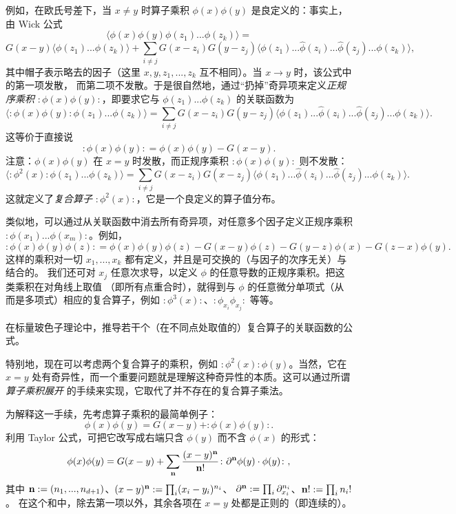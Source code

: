 例如，在欧氏号差下，当 $x\ne y$ 时算子乘积 $\phi(x)\phi(y)$ 是良定义的：事实上，由 Wick 公式
$$
\langle \phi(x)\phi(y)\phi(z_1)...\phi(z_k)\rangle=
$$
$$
G(x-y)\langle \phi(z_1)...\phi(z_k)\rangle
+\sum_{i\ne j}G(x-z_i)G(y-z_j)\langle \phi(z_1)...\widehat \phi(z_i)...\widehat \phi(z_j)...\phi(z_k)\rangle,
$$
其中帽子表示略去的因子（这里 $x,y,z_1,...,z_k$ 互不相同）。当 $x\to y$ 时，该公式中的第一项发散，
而第二项不发散。于是很自然地，通过“扔掉”奇异项来定义\emph{正规序乘积}
$\colon \phi(x)\phi(y)\colon$，即要求它与 $\phi(z_1)...\phi(z_k)$ 的关联函数为
 $$
\langle \colon\phi(x)\phi(y)\colon\phi(z_1)...\phi(z_k)\rangle=
\sum_{i\ne j}G(x-z_i)G(y-z_j)\langle \phi(z_1)...\widehat \phi(z_i)...\widehat \phi(z_j)...\phi(z_k)\rangle.
$$
这等价于直接说
$$
\colon\phi(x)\phi(y)\colon=\phi(x)\phi(y)-G(x-y).
$$
注意：$\phi(x)\phi(y)$ 在 $x=y$ 时发散，而正规序乘积 $\colon \phi(x)\phi(y)\colon$ 则不发散：
$$
\langle \colon\phi^2(x)\colon\phi(z_1)...\phi(z_k)\rangle=
\sum_{i\ne j}G(x-z_i)G(x-z_j)\langle \phi(z_1)...\widehat \phi(z_i)...\widehat \phi(z_j)...\phi(z_k)\rangle.
$$
这就定义了\emph{复合算子} $\colon\phi^2(x)\colon$，它是一个良定义的算子值分布。

类似地，可以通过从关联函数中消去所有奇异项，对任意多个因子定义正规序乘积
$\colon \phi(x_1)...\phi(x_m)\colon$。例如，
$$
\colon \phi(x)\phi(y)\phi(z)\colon=\phi(x)\phi(y)\phi(z)-G(x-y)\phi(z)-G(y-z)\phi(x)-G(z-x)\phi(y).
$$
这样的乘积对一切 $x_1,...,x_k$ 都有定义，并且是可交换的（与因子的次序无关）与结合的。
我们还可对 $x_j$ 任意次求导，以定义 $\phi$ 的任意导数的正规序乘积。把这类乘积在对角线上取值
（即所有点重合时），就得到与 $\phi$ 的任意微分单项式（从而是多项式）相应的复合算子，例如
$\colon\phi^3(x)\colon$、$:\phi_{x_i}\phi_{x_j}:$ 等等。

\begin{exercise} 在标量玻色子理论中，推导若干个（在不同点处取值的）复合算子的关联函数的公式。
\end{exercise} 

特别地，现在可以考虑两个复合算子的乘积，例如 $\colon\phi^2(x)\colon \phi(y)$。当然，它在
$x=y$ 处有奇异性，而一个重要问题就是理解这种奇异性的本质。这可以通过所谓\emph{算子乘积展开}
的手续来实现，它取代了并不存在的复合算子乘法。

为解释这一手续，先考虑算子乘积的最简单例子：
$$
\phi(x)\phi(y)=G(x-y)+\colon \phi(x)\phi(y)\colon.
$$
利用 Taylor 公式，可把它改写成右端只含 $\phi(y)$ 而不含 $\phi(x)$ 的形式：
$$
\phi(x)\phi(y)=G(x-y)+\sum_{\bold n}\frac{(x-y)^{\bold n}}{\bold n!}\colon \partial^{\bold n}\phi(y)\cdot \phi(y)\colon,
$$
其中 $\bold n:=(n_1,...,n_{d+1})$、$(x-y)^\bold n:=\prod_i (x_i-y_i)^{n_i}$、
$\partial^{\bold n}:=\prod_i \partial_{x_i}^{n_i}$、$\bold n!:=\prod_i n_i!$。
在这个和中，除去第一项以外，其余各项在 $x=y$ 处都是正则的（即连续的）。

